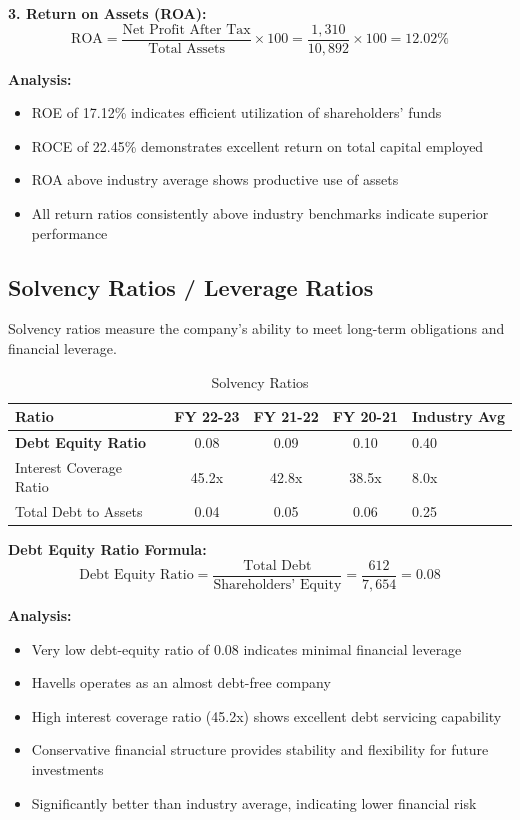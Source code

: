 \documentclass[12pt,a4paper]{article}
\begin{document}
\textbf{3. Return on Assets (ROA):}
\[
\text{ROA} = \frac{\text{Net Profit After Tax}}{\text{Total Assets}} \times 100 = \frac{1,310}{10,892} \times 100 = 12.02\%
\]

\textbf{Analysis:}
\begin{itemize}
    \item ROE of 17.12\% indicates efficient utilization of shareholders' funds
    \item ROCE of 22.45\% demonstrates excellent return on total capital employed
    \item ROA above industry average shows productive use of assets
    \item All return ratios consistently above industry benchmarks indicate superior performance
\end{itemize}

\subsection{Solvency Ratios / Leverage Ratios}

Solvency ratios measure the company's ability to meet long-term obligations and financial leverage.

\begin{table}[H]
    \centering
    \caption{Solvency Ratios}
    \begin{tabular}{|l|c|c|c|l|}
        \hline
        \textbf{Ratio} & \textbf{FY 22-23} & \textbf{FY 21-22} & \textbf{FY 20-21} & \textbf{Industry Avg} \\
        \hline
        \textbf{Debt Equity Ratio} & 0.08 & 0.09 & 0.10 & 0.40 \\
        \hline
        Interest Coverage Ratio & 45.2x & 42.8x & 38.5x & 8.0x \\
        \hline
        Total Debt to Assets & 0.04 & 0.05 & 0.06 & 0.25 \\
        \hline
    \end{tabular}
\end{table}

\textbf{Debt Equity Ratio Formula:}
\[
\text{Debt Equity Ratio} = \frac{\text{Total Debt}}{\text{Shareholders' Equity}} = \frac{612}{7,654} = 0.08
\]

\textbf{Analysis:}
\begin{itemize}
    \item Very low debt-equity ratio of 0.08 indicates minimal financial leverage
    \item Havells operates as an almost debt-free company
    \item High interest coverage ratio (45.2x) shows excellent debt servicing capability
    \item Conservative financial structure provides stability and flexibility for future investments
    \item Significantly better than industry average, indicating lower financial risk
\end{itemize}
\end{document}
